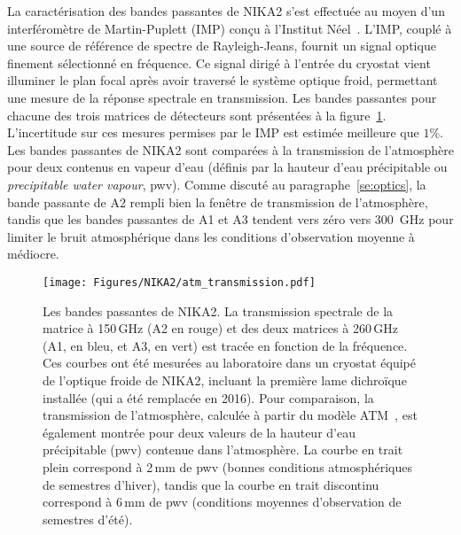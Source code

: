 La caractérisation des bandes passantes de NIKA2 s'est effectuée au
moyen d'un interféromètre de Martin-Puplett (IMP) conçu à l'Institut
Néel~\citep{Durand2007_these}. L'IMP, couplé à une source de référence de
spectre de Rayleigh-Jeans, fournit un signal optique finement
sélectionné en fréquence. Ce signal dirigé à l'entrée du cryostat
vient illuminer le plan focal après avoir traversé le système optique
froid, permettant une mesure de la réponse spectrale en
transmission. Les bandes passantes pour chacune des trois matrices de
détecteurs sont présentées à la
figure~\ref{fig:bandpass}. L'incertitude sur ces mesures permises
par le IMP est estimée meilleure que $1\%$. Les bandes
passantes de NIKA2 sont comparées à la transmission de l'atmosphère
pour deux contenus en vapeur d'eau (définis par la hauteur d'eau
précipitable ou \emph{precipitable water vapour}, pwv). Comme discuté
au paragraphe~\ref{se:optics}, la bande passante de A2 rempli bien la
fenêtre de transmission de l'atmosphère, tandis que les bandes
passantes de A1 et A3 tendent vers zéro vers 300~GHz pour limiter le
bruit atmosphérique dans les conditions d'observation moyenne à
médiocre.

\begin{figure}[!thbp] 
\begin{center}
\texttt{[image: Figures/NIKA2/atm\_transmission.pdf]}
\caption[Les bandes passantes]{Les bandes passantes de NIKA2. La
  transmission spectrale de la matrice à 150\,GHz (A2 en rouge) et des
  deux matrices à 260\,GHz (A1, en bleu, et A3, en vert) est tracée en
  fonction de la fréquence. Ces courbes ont été mesurées au
  laboratoire dans un cryostat équipé de l'optique froide de NIKA2,
  incluant la première lame dichroïque installée (qui a été remplacée
  en 2016). Pour comparaison, la transmission de l'atmosphère,
  calculée à partir du modèle ATM\citep{Pardo2002}~, est également
  montrée pour deux valeurs de la hauteur d'eau précipitable (pwv) contenue
  dans l'atmosphère. La courbe en trait plein correspond à 2\,mm de
  pwv (bonnes conditions atmosphériques de semestres d'hiver), tandis que la courbe
  en trait discontinu correspond à 6\,mm de pwv (conditions moyennes
  d'observation de semestres d'été).} 
 \label{fig:bandpass}
\end{center}
\end{figure}

%
%
%
%
%
%
%
